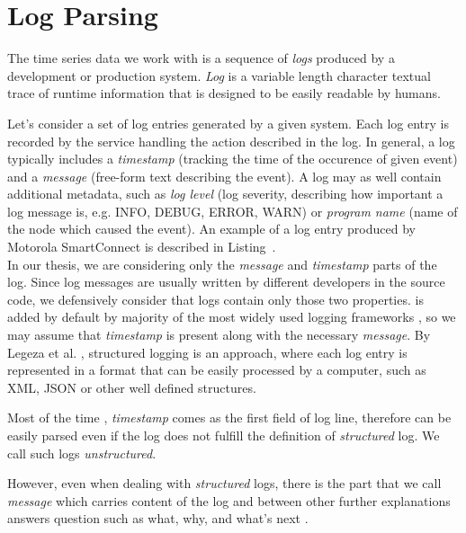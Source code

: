 \section{Log Parsing}

The time series data we work with is a sequence of \textit{logs} produced by a development or production system. 
\textit{Log} is a variable length character textual trace of runtime information that is designed to be easily readable by humans.

Let's consider a set of log entries generated by a given system. Each log entry is recorded by the service handling the action described in the log. In general, a log typically includes a \textit{timestamp} (tracking the time of the occurence of given event) and a \textit{message} (free-form text describing the event). A log may as well contain additional metadata, such as \textit{log level} (log severity, describing how important a log message is, e.g. INFO, DEBUG, ERROR, WARN) or \textit{program name} (name of the node which caused the event). An example of a log entry produced by Motorola SmartConnect is described in Listing~.\\

In our thesis, we are considering only the \textit{message} and \textit{timestamp} parts of the log. Since log messages are usually written by different developers in the source code, we defensively consider that logs contain only those two properties.  is added by default by majority of the most widely used logging frameworks \cite{log4j:example} \cite{serilog:example} \cite{python_log:example}, so we may assume that \textit{timestamp} is present along with the necessary \textit{message}.
By Legeza et al. \cite{structured_logging}, structured logging is an approach, where each log entry is represented in a format that can be easily processed by a computer, such as XML, JSON or other well defined structures.

Most of the time \cite{log4j:example} \cite{serilog:example} \cite{python_log:example}, \textit{timestamp} comes as the first field of log line, therefore can be easily parsed even if the log does not fulfill the definition of \textit{structured} log. We call such logs \textit{unstructured}.

However, even when dealing with \textit{structured} logs, there is the part that we call \textit{message} which carries content of the log and between other further explanations answers question such as what, why, and what's next \cite{structured_logging}.\\

